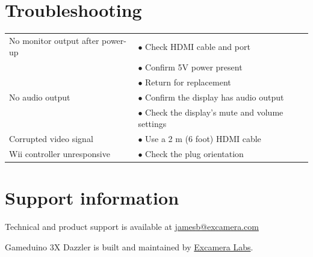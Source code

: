\documentclass{article}
\newcommand{\device}{Gameduino 3X Dazzler}
\newcommand{\gap}{\vspace{10pt}}
\begin{document}
\newpage
\section{Troubleshooting}

\gap
\begin{tabular}{|l|l|}
\hline
No monitor output after power-up     & $\bullet$ Check HDMI cable and port \\
                                     & $\bullet$ Confirm 5V power present \\
                                     & $\bullet$ Return for replacement \\
\hline
No audio output                      & $\bullet$ Confirm the display has audio output \\
                                     & $\bullet$ Check the display's mute and volume settings \\
\hline
Corrupted video signal               & $\bullet$ Use a 2 m (6 foot) HDMI cable \\
\hline
Wii controller unresponsive          & $\bullet$ Check the plug orientation \\
\hline
\end{tabular}
\gap

\section{Support information}

Technical and product support is available at
\href{mailto:jamesb@excamera.com}{jamesb@excamera.com}

\device{} is built and maintained by
\href{https://excamera.com}{Excamera Labs}.


\newpage
\raggedright
{}
\renewcommand{\indexname}{Index}
\printindex
\end{document}
